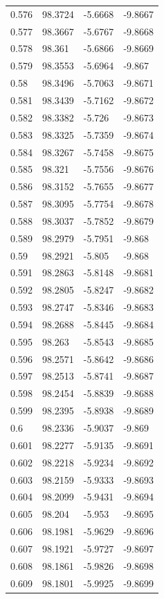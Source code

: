 \begin{tabular}{llll}
0.576 & 98.3724 & -5.6668 & -9.8667 \\
0.577 & 98.3667 & -5.6767 & -9.8668 \\
0.578 & 98.361 & -5.6866 & -9.8669 \\
0.579 & 98.3553 & -5.6964 & -9.867 \\
0.58 & 98.3496 & -5.7063 & -9.8671 \\
0.581 & 98.3439 & -5.7162 & -9.8672 \\
0.582 & 98.3382 & -5.726 & -9.8673 \\
0.583 & 98.3325 & -5.7359 & -9.8674 \\
0.584 & 98.3267 & -5.7458 & -9.8675 \\
0.585 & 98.321 & -5.7556 & -9.8676 \\
0.586 & 98.3152 & -5.7655 & -9.8677 \\
0.587 & 98.3095 & -5.7754 & -9.8678 \\
0.588 & 98.3037 & -5.7852 & -9.8679 \\
0.589 & 98.2979 & -5.7951 & -9.868 \\
0.59 & 98.2921 & -5.805 & -9.868 \\
0.591 & 98.2863 & -5.8148 & -9.8681 \\
0.592 & 98.2805 & -5.8247 & -9.8682 \\
0.593 & 98.2747 & -5.8346 & -9.8683 \\
0.594 & 98.2688 & -5.8445 & -9.8684 \\
0.595 & 98.263 & -5.8543 & -9.8685 \\
0.596 & 98.2571 & -5.8642 & -9.8686 \\
0.597 & 98.2513 & -5.8741 & -9.8687 \\
0.598 & 98.2454 & -5.8839 & -9.8688 \\
0.599 & 98.2395 & -5.8938 & -9.8689 \\
0.6 & 98.2336 & -5.9037 & -9.869 \\
0.601 & 98.2277 & -5.9135 & -9.8691 \\
0.602 & 98.2218 & -5.9234 & -9.8692 \\
0.603 & 98.2159 & -5.9333 & -9.8693 \\
0.604 & 98.2099 & -5.9431 & -9.8694 \\
0.605 & 98.204 & -5.953 & -9.8695 \\
0.606 & 98.1981 & -5.9629 & -9.8696 \\
0.607 & 98.1921 & -5.9727 & -9.8697 \\
0.608 & 98.1861 & -5.9826 & -9.8698 \\
0.609 & 98.1801 & -5.9925 & -9.8699 \\

\end{tabular}
